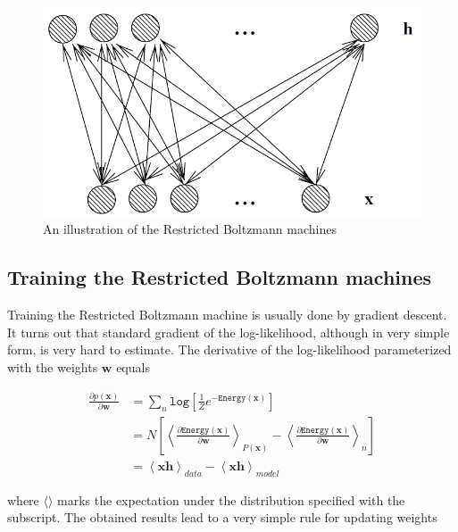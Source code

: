 \begin{figure}
	\begin{center}
		\includegraphics[scale=0.5]{Figures/describing/restricted_boltzmann_machines}
	\end{center}
	\caption{An illustration of the Restricted Boltzmann machines}
	\label{img:RestBoltzMach}
\end{figure}


\subsection{Training the Restricted Boltzmann machines}

Training the Restricted Boltzmann machine is usually done by gradient descent. It turns out that standard gradient of the log-likelihood, although in very simple form, is very hard to estimate. The derivative of the log-likelihood parameterized with the weights $\mathbf{w}$ equals

\begin{align}
		\frac{\partial p(\mathbf{x})}{\partial \mathbf{w}} & = \sum_n \mathtt{log} \left [ \frac{1}{Z} e ^{-\mathtt{Energy}(\mathbf{x})}  \right ] \\
		& = N \left [ \left \langle \frac{\partial \mathtt{Energy}(\mathbf{x})}{\partial \mathbf{w}}  \right \rangle_{P(\mathbf{x})} - \left \langle \frac{\partial \mathtt{Energy}(\mathbf{x})}{\partial \mathbf{w}} \right \rangle_n  \right ] \\
		& = \left \langle \mathbf{x}\mathbf{h} \right \rangle_{data} - \left \langle \mathbf{x}\mathbf{h} \right \rangle_{model}
\end{align}

where $\langle \rangle$ marks the expectation under the distribution specified with the subscript. The obtained results lead to a very simple rule for updating weights

